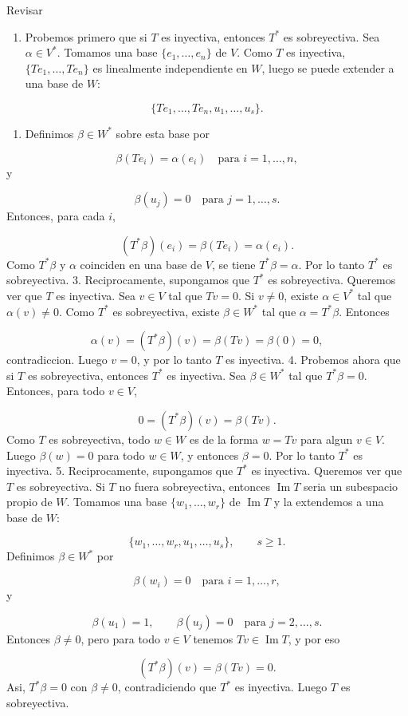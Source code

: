 \begin{bookproof}{Revisar}
\begin{enumerate}
\item Probemos primero que si $T$ es inyectiva, entonces $T^*$ es sobreyectiva. Sea $\alpha \in V^*$. Tomamos una base $\{e_1,\ldots,e_n\}$ de $V$. Como $T$ es inyectiva, $\{Te_1,\ldots,Te_n\}$ es linealmente independiente en $W$, luego se puede extender a una base de $W$:
\end{enumerate}
\[
\{Te_1,\ldots,Te_n,u_1,\ldots,u_s\}.
\]
\begin{enumerate}[start=2]
\item Definimos $\beta \in W^*$ sobre esta base por
\end{enumerate}
\[
\beta(Te_i)=\alpha(e_i)\quad \text{para } i=1,\ldots,n,
\]
y

\[
\beta(u_j)=0\quad \text{para } j=1,\ldots,s.
\]
Entonces, para cada $i$,

\[
(T^*\beta)(e_i)=\beta(Te_i)=\alpha(e_i).
\]
Como $T^*\beta$ y $\alpha$ coinciden en una base de $V$, se tiene $T^*\beta=\alpha$. Por lo tanto $T^*$ es sobreyectiva. 3. Reciprocamente, supongamos que $T^*$ es sobreyectiva. Queremos ver que $T$ es inyectiva. Sea $v \in V$ tal que $Tv=0$. Si $v \ne 0$, existe $\alpha \in V^*$ tal que $\alpha(v)\ne 0$. Como $T^*$ es sobreyectiva, existe $\beta \in W^*$ tal que $\alpha=T^*\beta$. Entonces

\[
\alpha(v)=(T^*\beta)(v)=\beta(Tv)=\beta(0)=0,
\]
contradiccion. Luego $v=0$, y por lo tanto $T$ es inyectiva. 4. Probemos ahora que si $T$ es sobreyectiva, entonces $T^*$ es inyectiva. Sea $\beta \in W^*$ tal que $T^*\beta=0$. Entonces, para todo $v \in V$,

\[
0=(T^*\beta)(v)=\beta(Tv).
\]
Como $T$ es sobreyectiva, todo $w \in W$ es de la forma $w=Tv$ para algun $v \in V$. Luego $\beta(w)=0$ para todo $w \in W$, y entonces $\beta=0$. Por lo tanto $T^*$ es inyectiva. 5. Reciprocamente, supongamos que $T^*$ es inyectiva. Queremos ver que $T$ es sobreyectiva. Si $T$ no fuera sobreyectiva, entonces $\operatorname{Im}T$ seria un subespacio propio de $W$. Tomamos una base $\{w_1,\ldots,w_r\}$ de $\operatorname{Im}T$ y la extendemos a una base de $W$:

\[
\{w_1,\ldots,w_r,u_1,\ldots,u_s\},\qquad s\ge 1.
\]
Definimos $\beta \in W^*$ por

\[
\beta(w_i)=0\quad \text{para } i=1,\ldots,r,
\]
y

\[
\beta(u_1)=1,\qquad \beta(u_j)=0\quad \text{para } j=2,\ldots,s.
\]
Entonces $\beta \ne 0$, pero para todo $v \in V$ tenemos $Tv \in \operatorname{Im}T$, y por eso

\[
(T^*\beta)(v)=\beta(Tv)=0.
\]
Asi, $T^*\beta=0$ con $\beta \ne 0$, contradiciendo que $T^*$ es inyectiva. Luego $T$ es sobreyectiva.

\bookqed
\end{bookproof}
\label{blk:dual-inyectiva-sobreyectiva}
